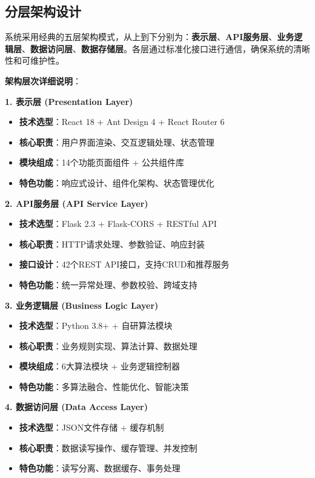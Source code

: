 \documentclass[12pt,a4paper]{article}
\begin{document}
\subsection{分层架构设计}

\begin{infobox}[title={五层架构模型}]
系统采用经典的五层架构模式，从上到下分别为：\textcolor{primary}{\textbf{表示层}}、\textcolor{secondary}{\textbf{API服务层}}、\textcolor{accent}{\textbf{业务逻辑层}}、\textcolor{success}{\textbf{数据访问层}}、\textcolor{warning}{\textbf{数据存储层}}。各层通过标准化接口进行通信，确保系统的清晰性和可维护性。
\end{infobox}

\textbf{架构层次详细说明}：

\textbf{1. 表示层 (Presentation Layer)}
\begin{itemize}
    \item \textbf{技术选型}：React 18 + Ant Design 4 + React Router 6
    \item \textbf{核心职责}：用户界面渲染、交互逻辑处理、状态管理
    \item \textbf{模块组成}：14个功能页面组件 + 公共组件库
    \item \textbf{特色功能}：响应式设计、组件化架构、状态管理优化
\end{itemize}

\textbf{2. API服务层 (API Service Layer)}
\begin{itemize}
    \item \textbf{技术选型}：Flask 2.3 + Flask-CORS + RESTful API
    \item \textbf{核心职责}：HTTP请求处理、参数验证、响应封装
    \item \textbf{接口设计}：42个REST API接口，支持CRUD和推荐服务
    \item \textbf{特色功能}：统一异常处理、参数校验、跨域支持
\end{itemize}

\textbf{3. 业务逻辑层 (Business Logic Layer)}
\begin{itemize}
    \item \textbf{技术选型}：Python 3.8+ + 自研算法模块
    \item \textbf{核心职责}：业务规则实现、算法计算、数据处理
    \item \textbf{模块组成}：6大算法模块 + 业务逻辑控制器
    \item \textbf{特色功能}：多算法融合、性能优化、智能决策
\end{itemize}

\textbf{4. 数据访问层 (Data Access Layer)}
\begin{itemize}
    \item \textbf{技术选型}：JSON文件存储 + 缓存机制
    \item \textbf{核心职责}：数据读写操作、缓存管理、并发控制
    \item \textbf{特色功能}：读写分离、数据缓存、事务处理
\end{itemize}
\end{document}
